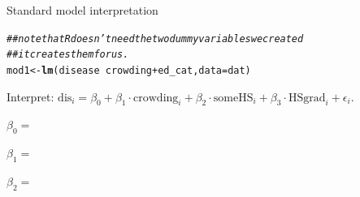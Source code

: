 \documentclass[table]{beamer}\usepackage[]{graphicx}\usepackage[]{color}
\makeatletter
\newcommand{\hlcom}[1]{\textcolor[rgb]{0.678,0.584,0.686}{\textit{#1}}}%
\newcommand{\hlopt}[1]{\textcolor[rgb]{0,0,0}{#1}}%
\newcommand{\hlstd}[1]{\textcolor[rgb]{0.345,0.345,0.345}{#1}}%
\newcommand{\hlkwb}[1]{\textcolor[rgb]{0.69,0.353,0.396}{#1}}%
\newcommand{\hlkwc}[1]{\textcolor[rgb]{0.333,0.667,0.333}{#1}}%
\newcommand{\hlkwd}[1]{\textcolor[rgb]{0.737,0.353,0.396}{\textbf{#1}}}%
\newenvironment{kframe}{%
 \def\at@end@of@kframe{}%
 \ifinner\ifhmode%
  \def\at@end@of@kframe{\end{minipage}}%
  \begin{minipage}{\columnwidth}%
 \fi\fi%
 \def\FrameCommand##1{\hskip\@totalleftmargin \hskip-\fboxsep
 \colorbox{shadecolor}{##1}\hskip-\fboxsep
     \hskip-\linewidth \hskip-\@totalleftmargin \hskip\columnwidth}%
 \MakeFramed {\advance\hsize-\width
   \@totalleftmargin\z@ \linewidth\hsize
   \@setminipage}}%
 {\par\unskip\endMakeFramed%
 \at@end@of@kframe}
\newenvironment{knitrout}{}{} %
\makeatother
\begin{document}
\begin{frame}[fragile]{Standard model interpretation}

\begin{knitrout}\scriptsize
{}\color{fgcolor}\begin{kframe}
\begin{alltt}
\hlcom{## note that R doesn't need the two dummy variables we created}
\hlcom{## it creates them for us.}
\hlstd{mod1} \hlkwb{<-} \hlkwd{lm}\hlstd{(disease} \hlopt{~} \hlstd{crowding} \hlopt{+} \hlstd{ed_cat,} \hlkwc{data}\hlstd{=dat)}
\end{alltt}
\end{kframe}
\end{knitrout}

Interpret:  $ \mbox{dis}_i = \beta_0 + \beta_1 \cdot \mbox{crowding}_i + \beta_2 \cdot \mbox{someHS}_{i} + \beta_{3} \cdot \mbox{HSgrad}_{i} + \epsilon_{i}$.

\bigskip

$\beta_0 = $

\vspace{1.5cm}

$\beta_1 = $

\vspace{1.5cm}

$\beta_2 = $


\end{frame}


% 
% 
% 
% 
% 
% 
% 
% 

\end{document}
